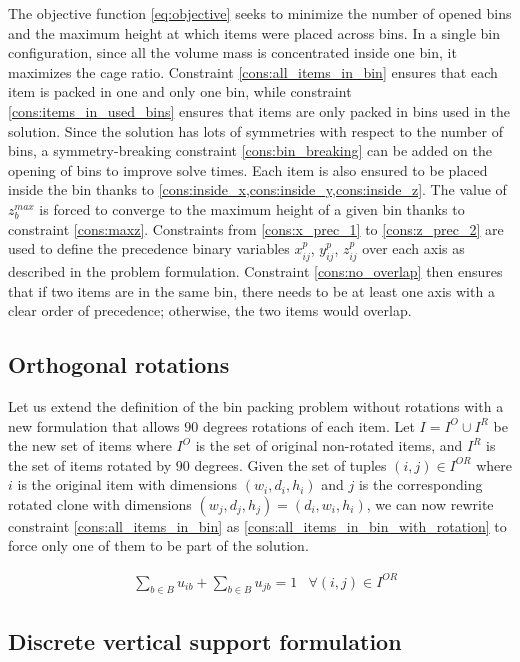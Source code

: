 The objective function \ref{eq:objective} seeks to minimize the number of opened bins and the maximum height at which items were placed across bins.
In a single bin configuration, since all the volume mass is concentrated inside one bin, it maximizes the cage ratio.
Constraint \ref{cons:all_items_in_bin} ensures that each item is packed in one and only one bin, while constraint \ref{cons:items_in_used_bins} ensures that items are only packed in bins used in the solution.
Since the solution has lots of symmetries with respect to the number of bins, a symmetry-breaking constraint \ref{cons:bin_breaking} can be added on the opening of bins to improve solve times.
Each item is also ensured to be placed inside the bin thanks to \cref{cons:inside_x,cons:inside_y,cons:inside_z}.
The value of $z^{max}_b$ is forced to converge to the maximum height of a given bin thanks to constraint \ref{cons:maxz}.
Constraints from \ref{cons:x_prec_1} to \ref{cons:z_prec_2} are used to define the precedence binary variables $x^p_{ij}$, $y^p_{ij}$, $z^p_{ij}$ over each axis as described in the problem formulation.
Constraint \ref{cons:no_overlap} then ensures that if two items are in the same bin, there needs to be at least one axis with a clear order of precedence; otherwise, the two items would overlap.
\subsection{Orthogonal rotations}
\label{subsec:orthogonal_rotations}%

Let us extend the definition of the bin packing problem without rotations with a new formulation that allows $90$ degrees rotations of each item.
Let $I = I^O \cup I^R$ be the new set of items where $I^O$ is the set of original non-rotated items, and $I^R$ is the set of items rotated by $90$ degrees.
Given the set of tuples $(i, j) \in I^{OR}$ where $i$ is the original item with dimensions $(w_i, d_i, h_i)$ and $j$ is the corresponding rotated clone with dimensions $(w_j, d_j, h_j) = (d_i, w_i, h_i)$, we can now rewrite constraint \ref{cons:all_items_in_bin} as \ref{cons:all_items_in_bin_with_rotation} to force only one of them to be part of the solution.

\begin{align}
    & \sum\limits_{b \in B} u_{ib} + \sum\limits_{b \in B} u_{jb} = 1 & \forall (i, j) \in I^{OR} \label{cons:all_items_in_bin_with_rotation}
\end{align}

\subsection{Discrete vertical support formulation}
\label{subsec:vertical_support_formulation}%

